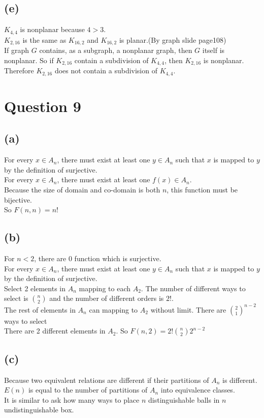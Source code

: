 \documentclass{article} %
\begin{document}
\subsection*{(e)}
$K_{4,4}$ is nonplanar because $4>3$.\\
$K_{2,16}$ is the same as $K_{16,2}$ and $K_{16,2}$ is planar.(By graph slide page108)\\
If graph $G$ contains, as a subgraph, a nonplanar graph, then $G$ itself is nonplanar. So if $K_{2,16}$ contain a subdivision of $K_{4,4}$, then $K_{2,16}$ is nonplanar.\\
Therefore $K_{2,16}$ does not contain a subdivision of $K_{4,4}$.\\
\section*{Question 9}
\subsection*{(a)}
For every $x \in A_n$, there must exist at least one $y\in A_n$ such that $x$ is mapped to $y$ by the definition of surjective.\\
For every $x \in A_n$, there must exist at least one $f(x)\in A_n$.\\
Because the size of domain and co-domain is both $n$, this function must be bijective.\\
So $F(n,n) = n!$\\
\subsection*{(b)}
For $n < 2$, there are 0 function which is surjective.\\
For every $x \in A_n$, there must exist at least one $y\in A_n$ such that $x$ is mapped to $y$ by the definition of surjective.\\
Select 2 elements in $A_n$ mapping to each $A_2$. The number of different ways to select is $\binom{n}{2}$ and the number of different orders is $2!$.\\
The rest of elements in $A_n$ can mapping to $A_2$ without limit. There are $\binom{2}{1}^{n-2}$ ways to select\\
There are 2 different elements in $A_2$. So $F(n,2) = 2!\binom{n}{2}2^{n-2}$\\
\subsection*{(c)}
Because two equivalent relations are different if their partitions of $A_n$ is different.\\
$E(n)$ is equal to the number of partitions of $A_n$ into equivalence classes.\\
It is similar to ask how many ways to place $n$ distinguishable balls in $n$ undistinguishable box.\\ 
\end{document}
